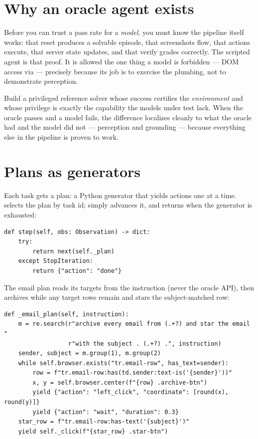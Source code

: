 \documentclass[11pt,openany]{book}
\newcommand{\code}[1]{\textcolor{clayd}{\texttt{\detokenize{#1}}}}
\newcounter{exc}[chapter]
\begin{document}
\section{Why an oracle agent exists}

Before you can trust a pass rate for a \emph{model}, you must know the pipeline
itself works: that reset produces a solvable episode, that screenshots flow, that
actions execute, that server state updates, and that verify grades correctly. The
scripted agent is that proof. It is allowed the one thing a model is forbidden —
DOM access via \code{browser.center} — precisely because its job is to exercise
the plumbing, not to demonstrate perception.

\begin{principle}[.\ ]
Build a privileged reference solver whose success certifies the \emph{environment}
and whose privilege is exactly the capability the models under test lack. When the
oracle passes and a model fails, the difference localizes cleanly to what the
oracle had and the model did not — perception and grounding — because everything
else in the pipeline is proven to work.
\end{principle}

\section{Plans as generators}

Each task gets a plan: a Python generator that yields actions one at a time.
\code{begin} selects the plan by task id; \code{step} simply advances it, and
returns \code{done} when the generator is exhausted:

\begin{lstlisting}[style=py]
def step(self, obs: Observation) -> dict:
    try:
        return next(self._plan)
    except StopIteration:
        return {"action": "done"}
\end{lstlisting}

The email plan reads its targets from the instruction (never the oracle API),
then archives while any target rows remain and stars the subject-matched row:

\begin{lstlisting}[style=py]
def _email_plan(self, instruction):
    m = re.search(r"archive every email from (.+?) and star the email "
                  r"with the subject . (.+?) .", instruction)
    sender, subject = m.group(1), m.group(2)
    while self.browser.exists("tr.email-row", has_text=sender):
        row = f"tr.email-row:has(td.sender:text-is('{sender}'))"
        x, y = self.browser.center(f"{row} .archive-btn")
        yield {"action": "left_click", "coordinate": [round(x), round(y)]}
        yield {"action": "wait", "duration": 0.3}
    star_row = f"tr.email-row:has-text('{subject}')"
    yield self._click(f"{star_row} .star-btn")
\end{lstlisting}
\end{document}
